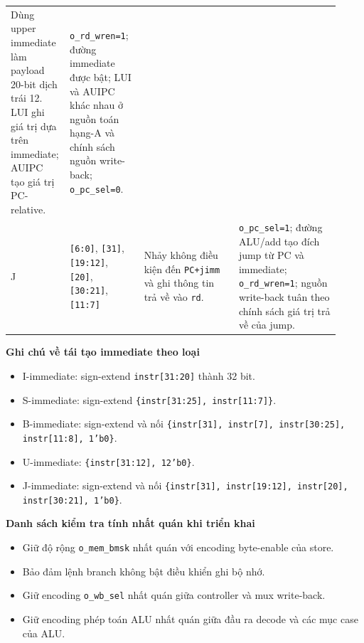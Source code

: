 \documentclass[10pt,a4paper]{article}
\begin{document}
\begin{center}
\begin{tabular}{@{}p{0.11\linewidth}p{0.22\linewidth}p{0.29\linewidth}p{0.30\linewidth}@{}}
Dùng upper immediate làm payload 20-bit dịch trái 12. LUI ghi giá trị dựa trên immediate; AUIPC tạo giá trị PC-relative. &
\texttt{o\_rd\_wren=1}; đường immediate được bật; LUI và AUIPC khác nhau ở nguồn toán hạng-A và chính sách nguồn write-back; \texttt{o\_pc\_sel=0}. \\
\addlinespace
J & \texttt{[6:0]}, \texttt{[31]}, \texttt{[19:12]}, \texttt{[20]}, \texttt{[30:21]}, \texttt{[11:7]} &
Nhảy không điều kiện đến \texttt{PC+jimm} và ghi thông tin trả về vào \texttt{rd}. &
\texttt{o\_pc\_sel=1}; đường ALU/add tạo đích jump từ PC và immediate; \texttt{o\_rd\_wren=1}; nguồn write-back tuân theo chính sách giá trị trả về của jump. \\
\bottomrule
\end{tabular}
\end{center}

\textbf{Ghi chú về tái tạo immediate theo loại}

\begin{itemize}
      \item I-immediate: sign-extend \texttt{instr[31:20]} thành 32 bit.
      \item S-immediate: sign-extend \texttt{\{instr[31:25], instr[11:7]\}}.
      \item B-immediate: sign-extend và nối
                        \texttt{\{instr[31], instr[7], instr[30:25], instr[11:8], 1'b0\}}.
      \item U-immediate: \texttt{\{instr[31:12], 12'b0\}}.
      \item J-immediate: sign-extend và nối
                        \texttt{\{instr[31], instr[19:12], instr[20], instr[30:21], 1'b0\}}.
\end{itemize}

\textbf{Danh sách kiểm tra tính nhất quán khi triển khai}

\begin{itemize}
      \item Giữ độ rộng \texttt{o\_mem\_bmsk} nhất quán với encoding byte-enable của store.
      \item Bảo đảm lệnh branch không bật điều khiển ghi bộ nhớ.
      \item Giữ encoding \texttt{o\_wb\_sel} nhất quán giữa controller và mux write-back.
      \item Giữ encoding phép toán ALU nhất quán giữa đầu ra decode và các mục case của ALU.
\end{itemize}
\end{document}
